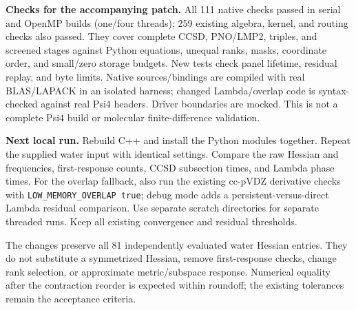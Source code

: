 \documentclass[10pt,letterpaper]{article}
\begin{document}
\textbf{Checks for the accompanying patch.} All 111 native checks passed in serial and OpenMP builds (one/four threads); 259 existing algebra, kernel, and routing checks also passed. They cover complete CCSD, PNO/LMP2, triples, and screened stages against Python equations, unequal ranks, masks, coordinate order, and small/zero storage budgets. New tests check panel lifetime, residual replay, and byte limits. Native sources/bindings are compiled with real BLAS/LAPACK in an isolated harness; changed Lambda/overlap code is syntax-checked against real Psi4 headers. Driver boundaries are mocked. This is not a complete Psi4 build or molecular finite-difference validation.

\textbf{Next local run.} Rebuild C++ and install the Python modules together. Repeat the supplied water input with identical settings. Compare the raw Hessian and frequencies, first-response counts, CCSD subsection times, and Lambda phase times. For the overlap fallback, also run the existing cc-pVDZ derivative checks with \texttt{LOW\_MEMORY\_OVERLAP true}; debug mode adds a persistent-versus-direct Lambda residual comparison. Use separate scratch directories for separate threaded runs. Keep all existing convergence and residual thresholds.

The changes preserve all 81 independently evaluated water Hessian entries. They do not substitute a symmetrized Hessian, remove first-response checks, change rank selection, or approximate metric/subspace response. Numerical equality after the contraction reorder is expected within roundoff; the existing tolerances remain the acceptance criteria.
\end{document}
